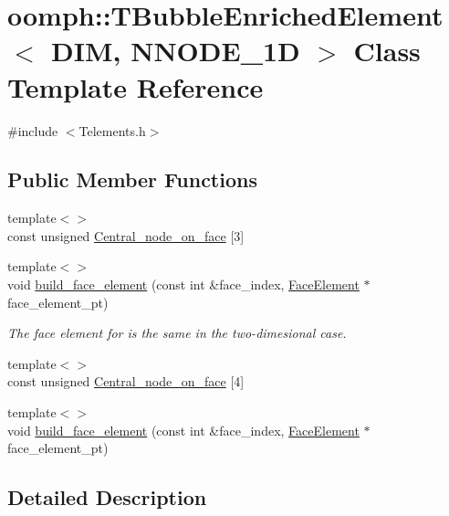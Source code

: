 \hypertarget{classoomph_1_1TBubbleEnrichedElement}{}\section{oomph\+:\+:T\+Bubble\+Enriched\+Element$<$ D\+IM, N\+N\+O\+D\+E\+\_\+1D $>$ Class Template Reference}
\label{classoomph_1_1TBubbleEnrichedElement}


{\ttfamily \#include $<$Telements.\+h$>$}

\subsection*{Public Member Functions}
\begin{DoxyCompactItemize}
\item 
{\footnotesize template$<$$>$ }\\const unsigned \hyperlink{classoomph_1_1TBubbleEnrichedElement_a0e194b044971e86f061500a8b1ecfc58}{Central\+\_\+node\+\_\+on\+\_\+face} \mbox{[}3\mbox{]}
\item 
{\footnotesize template$<$$>$ }\\void \hyperlink{classoomph_1_1TBubbleEnrichedElement_aeccf2f175fd1499a4463063b4cf50cd2}{build\+\_\+face\+\_\+element} (const int \&face\+\_\+index, \hyperlink{classoomph_1_1FaceElement}{Face\+Element} $\ast$face\+\_\+element\+\_\+pt)
\begin{DoxyCompactList}\small\item\em The face element for is the same in the two-\/dimesional case. \end{DoxyCompactList}\item 
{\footnotesize template$<$$>$ }\\const unsigned \hyperlink{classoomph_1_1TBubbleEnrichedElement_af203d265f3f1f6b64559aa1f559d33ff}{Central\+\_\+node\+\_\+on\+\_\+face} \mbox{[}4\mbox{]}
\item 
{\footnotesize template$<$$>$ }\\void \hyperlink{classoomph_1_1TBubbleEnrichedElement_a546cbc867bc47ac24a8ff1a2fdd5301e}{build\+\_\+face\+\_\+element} (const int \&face\+\_\+index, \hyperlink{classoomph_1_1FaceElement}{Face\+Element} $\ast$face\+\_\+element\+\_\+pt)
\end{DoxyCompactItemize}


\subsection{Detailed Description}
